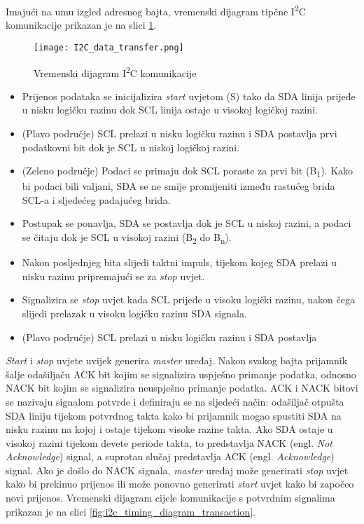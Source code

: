 Imajući na umu izgled adresnog bajta, vremenski dijagram tipčne I\textsuperscript{2}C komunikacije prikazan je na slici \ref{fig:i2c_timing_diagram}.
\begin{figure}[hp]
	\centering
	\texttt{[image: I2C\_data\_transfer.png]}
	\caption{Vremenski dijagram I\textsuperscript{2}C komunikacije
	\cite{i2c_wikipedia}}
	\label{fig:i2c_timing_diagram}
\end{figure}
\begin{itemize}
	\item Prijenos podataka se inicijalizira \textit{start} uvjetom (S) tako da SDA linija prijeđe u nisku logičku razinu dok SCL linija ostaje u visokoj logičkoj razini.
	\item (Plavo područje) SCL prelazi u nisku logičku razinu i SDA postavlja prvi podatkovni bit dok je SCL u niskoj logičkoj razini.
	\item (Zeleno područje) Podaci se primaju dok SCL poraste za prvi bit (B\textsubscript{1}). Kako bi podaci bili valjani, SDA se ne smije promijeniti između rastućeg brida SCL-a i sljedećeg padajućeg brida.
	\item Postupak se ponavlja, SDA se postavlja dok je SCL u niskoj razini, a podaci se čitaju dok je SCL u visokoj razini (B\textsubscript{2} do B\textsubscript{n}).
	\item Nakon posljednjeg bita slijedi taktni impuls, tijekom kojeg SDA prelazi u nisku razinu pripremajući se za \textit{stop} uvjet.
	\item Signalizira se \textit{stop} uvjet kada SCL prijeđe u visoku logički razinu, nakon čega slijedi prelazak u visoku logičku razinu SDA signala.
	\item (Plavo područje) SCL prelazi u nisku logičku razinu i SDA postavlja
\end{itemize}
\textit{Start} i \textit{stop} uvjete uvijek generira \textit{master} uređaj. Nakon svakog bajta prijamnik šalje odašiljaču ACK bit kojim se signalizira uspješno primanje podatka, odnosno NACK bit kojim se signalizira neuspješno primanje podatka. ACK i NACK bitovi se nazivaju signalom potvrde i definiraju se na sljedeći način: odašiljač otpušta SDA liniju tijekom potvrdnog takta kako bi prijamnik mogao spustiti SDA na nisku razinu na kojoj i ostaje tijekom visoke razine takta. Ako SDA ostaje u visokoj razini tijekom devete periode takta, to predstavlja NACK (engl. \textit{Not Acknowledge}) signal, a suprotan slučaj predstavlja ACK (engl. \textit{Acknowledge}) signal. Ako je došlo do NACK signala, \textit{master} uređaj može generirati \textit{stop} uvjet kako bi prekinuo prijenos ili može ponovno generirati \textit{start} uvjet kako bi započeo novi prijenos. Vremenski dijagram cijele komunikacije s potvrdnim signalima prikazan je na slici \ref{fig:i2c_timing_diagram_transaction}.

